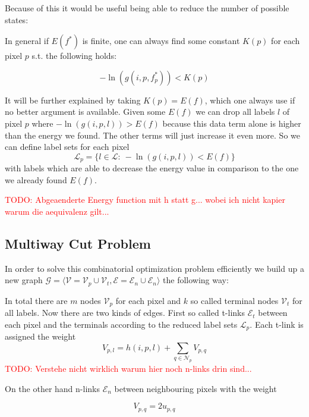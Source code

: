 \documentclass{scrartcl}[12pt, halfparskip]
\newcommand{\todo}[1]{\textcolor{red}{TODO: #1}}
\begin{document}
Because of this it would be useful being able to reduce the number of possible states:

In general if $E(f^*)$ is finite, one can always find some constant $K(p)$ for each pixel $p$ s.t. the following holds:

\begin{equation}
	- \ln(g(i, p, f_p^*)) < K(p)
\end{equation}

It will be further explained by taking $K(p) = E(f)$, which one always use if no better argument is available. Given some $E(f)$ we can drop all labels $l$ of pixel $p$ where $- \ln(g(i, p, l)) > E(f)$ because this data term alone is higher than the energy we found. The other terms will just increase it even more. So we can define label sets for each pixel
\begin{equation}
	\mathcal{L}_p = \{l \in \mathcal{L}: \ - \ln(g(i, p, l)) < E(f) \}
\end{equation}
with labels which are able to decrease the energy value in comparison to the one we already found $E(f)$.

\todo{Abgeaenderte Energy function mit h statt g... wobei ich nicht kapier warum die aequivalenz gilt...}


\subsection{Multiway Cut Problem}
In order to solve this combinatorial optimization problem efficiently we build up a new graph $\mathcal{G} = \langle \mathcal{V} = \mathcal{V}_p \cup \mathcal{V}_t, \mathcal{E} = \mathcal{E}_n \cup \mathcal{E}_n \rangle$ the following way:

In total there are $m$ nodes $\mathcal{V}_p$ for each pixel and $k$ so called terminal nodes $\mathcal{V}_t$ for all labels. Now there are two kinds of edges. First so called t-links $\mathcal{E}_t$ between each pixel and the terminals according to the reduced label sets $\mathcal{L}_p$. Each t-link is assigned the weight
\begin{equation}
	V_{p,l} = h(i,p,l) + \sum\limits_{q \in \mathcal{N}_p} V_{p,q}
\end{equation}
\todo{Verstehe nicht wirklich warum hier noch n-links drin sind...}

On the other hand n-links $\mathcal{E}_n$ between neighbouring pixels with the weight

\begin{equation}
	V_{p,q} = 2 u_{p,q}
\end{equation}
\end{document}
